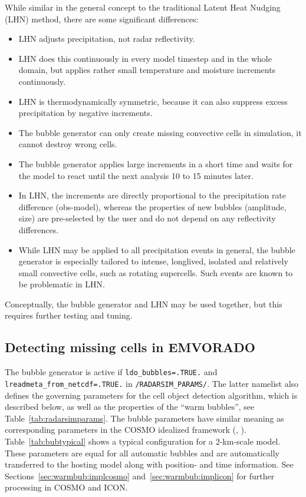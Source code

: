 \documentclass[10pt,a4paper,twoside,headinclude,footinclude,parskip=half]{scrartcl}
\newcommand{\myaktuellesection}{sec:intro}%
\newcommand{\labelsec}[1]{\label{#1}\renewcommand{\myaktuellesection}{#1}}%
\newcommand{\labelsec}[1]{\label{#1}}%
\newcommand{\citeNPK}[1]{\citeauthor{#1}, \citeyear{#1}}
\newcommand{\srcform}[1]{\mbox{\texttt{#1}}\xspace}%
\begin{document}
While similar in the general concept to the traditional Latent Heat Nudging (LHN) method, there are some significant differences:
\begin{itemize}
\item LHN adjusts precipitation, not radar reflectivity.
\item LHN does this continuously in every model timestep and in the whole domain, but applies rather small temperature and moisture increments continuously.
\item LHN is thermodynamically symmetric, because it can also suppress excess precipitation by negative increments.
\item The bubble generator can only create missing convective cells in simulation, it cannot destroy wrong cells.
\item The bubble generator applies large increments in a short time and waits for the model to react until the next analysis 10 to 15 minutes later.
\item In LHN, the increments are directly proportional to the precipitation rate difference (obs-model), whereas
  the properties of new bubbles (amplitude, size) are pre-selected by the user and do not depend on any reflectivity differences.
\item While LHN may be applied to all precipitation events in general, the bubble generator is especially tailored to
  intense, longlived, isolated and relatively small convective cells, such as rotating supercells. Such events are known
  to be problematic in LHN.
\end{itemize}
Conceptually, the bubble generator and LHN may be used together, but this requires further testing and tuning.


\subsection{Detecting missing cells in EMVORADO}

\labelsec{sec:warmbub:impl}

The bubble generator is active if \srcform{ldo_bubbles=.TRUE.} and \srcform{lreadmeta_from_netcdf=.TRUE.} in \srcform{/RADARSIM_PARAMS/}.
The latter namelist also defines the governing parameters for the cell object detection algorithm, which is described below,
as well as the properties of the ``warm bubbles'', see Table~\ref{tab:radarsimparams}.
The bubble parameters have similar meaning as corresponding parameters
in the COSMO idealized framework (\citeNPK{blahak2015b}).
Table~\ref{tab:bubtypical} shows a typical configuration for a 2-km-scale model.
These parameters are equal for all automatic bubbles and are automatically transferred to the hosting model along
with position- and time information.
See Sections~\ref{sec:warmbub:implcosmo} and~\ref{sec:warmbub:implicon} for further processing in COSMO and ICON.
\end{document}
